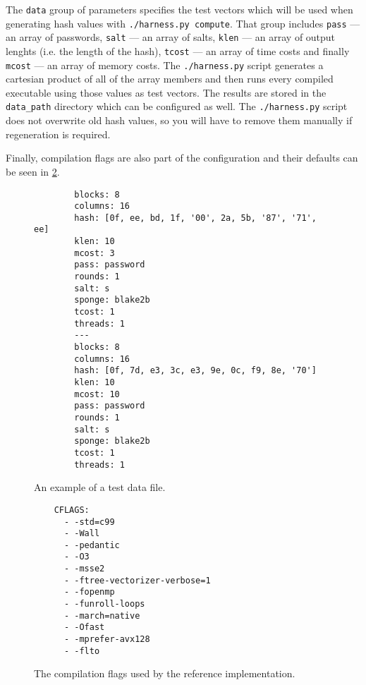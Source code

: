 The \texttt{data} group of parameters specifies the test vectors which will be used when generating hash values with \texttt{./harness.py compute}. That group includes \texttt{pass} --- an array of passwords, \texttt{salt} --- an array of salts, \texttt{klen} --- an array of output lenghts (i.e. the length of the hash), \texttt{tcost} --- an array of time costs and finally \texttt{mcost} --- an array of memory costs. The \texttt{./harness.py} script generates a cartesian product of all of the array members and then runs every compiled executable using those values as test vectors. The results are stored in the \texttt{data_path} directory which can be configured as well. The \texttt{./harness.py} script does not overwrite old hash values, so you will have to remove them manually if regeneration is required.

Finally, compilation flags are also part of the configuration and their defaults can be seen in \ref{fig:compile-flags}.

\begin{figure}
    \begin{verbatim}
        blocks: 8
        columns: 16
        hash: [0f, ee, bd, 1f, '00', 2a, 5b, '87', '71', ee]
        klen: 10
        mcost: 3
        pass: password
        rounds: 1
        salt: s
        sponge: blake2b
        tcost: 1
        threads: 1
        ---
        blocks: 8
        columns: 16
        hash: [0f, 7d, e3, 3c, e3, 9e, 0c, f9, 8e, '70']
        klen: 10
        mcost: 10
        pass: password
        rounds: 1
        salt: s
        sponge: blake2b
        tcost: 1
        threads: 1
      \end{verbatim}
    \caption{An example of a test data file.}
    \label{fig:yaml-data}
  \end{figure}


\begin{figure}
    \begin{verbatim}
    CFLAGS:
      - -std=c99
      - -Wall
      - -pedantic
      - -O3
      - -msse2
      - -ftree-vectorizer-verbose=1
      - -fopenmp
      - -funroll-loops
      - -march=native
      - -Ofast
      - -mprefer-avx128
      - -flto
      \end{verbatim}
      \caption{The compilation flags used by the reference implementation.}
      \label{fig:compile-flags}
  \end{figure}
